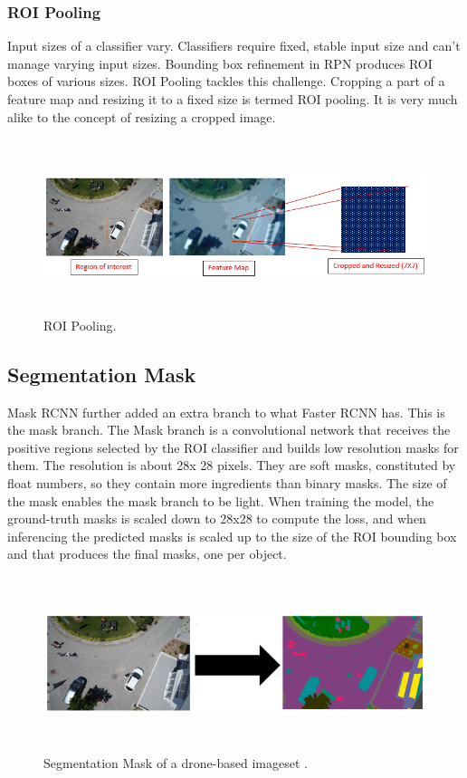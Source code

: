 \subsubsection{ROI Pooling}
Input sizes of a classifier vary. Classifiers require fixed, stable input size and can’t manage varying input sizes. Bounding box refinement in RPN produces ROI boxes of various sizes. ROI Pooling tackles this challenge. Cropping a part of a feature map and resizing it to a fixed size is termed ROI pooling. It is very much alike to the concept of resizing a cropped image.
\begin{figure}[H] 
\centering
  \includegraphics[height=2in]{images/roi1.png}
   \caption{ROI Pooling.}
\end{figure}

\subsection{Segmentation Mask}
Mask RCNN further added an extra branch to what Faster RCNN has. This is the mask branch. The Mask branch is a convolutional network that receives the positive regions selected by the ROI classifier and builds low resolution masks for them. The resolution is about 28x 28 pixels. They are soft masks, constituted by float numbers, so they contain more ingredients than binary masks. The size of the mask enables the mask branch to be light. When training the model, the ground-truth masks is scaled down to 28x28 to compute the loss, and when inferencing the predicted masks is scaled up to the size of the ROI bounding box and that produces the final masks, one per object.
\begin{figure}[H]
  \centering
    \includegraphics[height=2in]{images/mask.png}
     \caption{Segmentation Mask of a drone-based imageset .}
  \end{figure}


